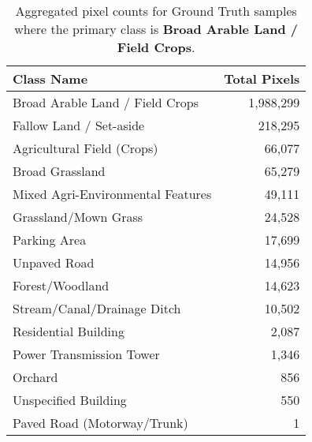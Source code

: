 \begin{table}[H] %
    \centering
    \caption{Aggregated pixel counts for Ground Truth samples where the primary class is \textbf{Broad Arable Land / Field Crops}.}
    \label{tab:gt_counts_35}
    \begin{tabular}{lr}
        \hline
        \textbf{Class Name} & \textbf{Total Pixels} \\
        \hline
        Broad Arable Land / Field Crops & 1,988,299 \\
        Fallow Land / Set-aside & 218,295 \\
        Agricultural Field (Crops) & 66,077 \\
        Broad Grassland & 65,279 \\
        Mixed Agri-Environmental Features & 49,111 \\
        Grassland/Mown Grass & 24,528 \\
        Parking Area & 17,699 \\
        Unpaved Road & 14,956 \\
        Forest/Woodland & 14,623 \\
        Stream/Canal/Drainage Ditch & 10,502 \\
        Residential Building & 2,087 \\
        Power Transmission Tower & 1,346 \\
        Orchard & 856 \\
        Unspecified Building & 550 \\
        Paved Road (Motorway/Trunk) & 1 \\
        \hline
    \end{tabular}
\end{table}

